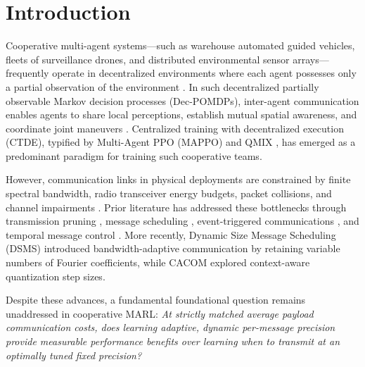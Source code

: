 \documentclass[10pt,twocolumn,letterpaper]{article}
\begin{document}
\section{Introduction}
Cooperative multi-agent systems—such as warehouse automated guided vehicles, fleets of surveillance drones, and distributed environmental sensor arrays—frequently operate in decentralized environments where each agent possesses only a partial observation of the environment \cite{oliehoek2016concise}. In such decentralized partially observable Markov decision processes (Dec-POMDPs), inter-agent communication enables agents to share local perceptions, establish mutual spatial awareness, and coordinate joint maneuvers \cite{sukhbaatar2016learning, singh2019learning, das2019tarmac}. Centralized training with decentralized execution (CTDE), typified by Multi-Agent PPO (MAPPO) \cite{yu2022surprising} and QMIX \cite{rashid2018qmix}, has emerged as a predominant paradigm for training such cooperative teams.

However, communication links in physical deployments are constrained by finite spectral bandwidth, radio transceiver energy budgets, packet collisions, and channel impairments \cite{mao2020learning, kim2019learning}. Prior literature has addressed these bottlenecks through transmission pruning \cite{mao2020learning}, message scheduling \cite{kim2019learning}, event-triggered communications \cite{hu2023event}, and temporal message control \cite{zhang2020succinct}. More recently, Dynamic Size Message Scheduling (DSMS) \cite{sun2024dynamic} introduced bandwidth-adaptive communication by retaining variable numbers of Fourier coefficients, while CACOM \cite{li2024context} explored context-aware quantization step sizes. 

Despite these advances, a fundamental foundational question remains unaddressed in cooperative MARL: \textit{At strictly matched average payload communication costs, does learning adaptive, dynamic per-message precision provide measurable performance benefits over learning when to transmit at an optimally tuned fixed precision?}
\end{document}
